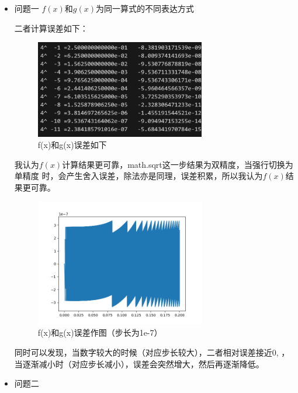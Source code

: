 \documentclass[10pt,a4paper,oneside]{article}
\begin{document}
\begin{itemize}
  \item 问题一
  $f(x)$和$g(x)$为同一算式的不同表达方式
  
  二者计算误差如下：
  \begin{figure}[H]
    \centering
    \includegraphics[width=0.7\textwidth]{屏幕截图 2024-09-12 184815.png}
    \caption{f(x)和g(x)误差如下}
  \end{figure}
  我认为$f(x)$计算结果更可靠，math.sqrt这一步结果为双精度，当强行切换为单精度
  时，会产生舍入误差，除法亦是同理，误差积累，所以我认为$f(x)$结果更可靠。
  
  \begin{figure}[H]
    \centering
    \includegraphics[width=0.7\textwidth]{Figure_1.png}
    \caption{f(x)和g(x)误差作图（步长为1e-7）}
  \end{figure}

  同时可以发现，当数字较大的时候（对应步长较大），二者相对误差接近0,
  ，当逐渐减小时（对应步长减小），误差会突然增大，然后再逐渐降低。

  \item 问题二
  

\end{itemize}
\end{document}
